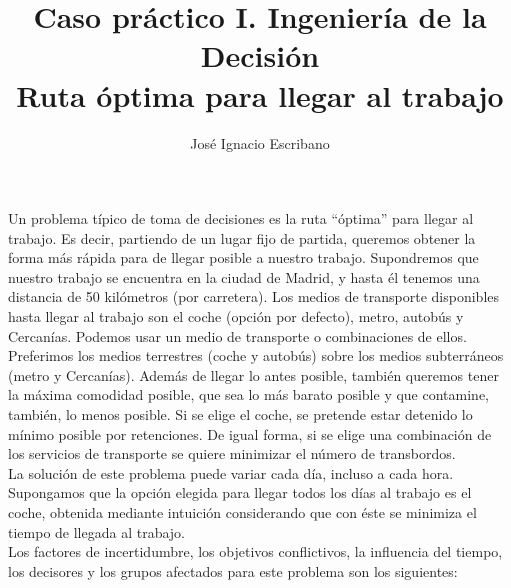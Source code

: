 \documentclass[12pt,a4paper,openright,final]{article}
\author{José Ignacio Escribano}
\title{Caso práctico I. Ingeniería de la Decisión \\ \textbf{Ruta óptima para llegar al trabajo}}
\begin{document}
\maketitle

Un problema típico de toma de decisiones es la ruta ``óptima'' para llegar al trabajo. Es decir, partiendo de un lugar fijo de partida, queremos obtener la forma más rápida para de llegar posible a nuestro trabajo. Supondremos que nuestro trabajo se encuentra en la ciudad de Madrid, y hasta él tenemos una distancia de 50 kilómetros (por carretera). Los medios de transporte disponibles hasta llegar al trabajo son el coche (opción por defecto), metro, autobús y Cercanías. Podemos usar un medio de transporte o combinaciones de ellos. Preferimos los medios terrestres (coche y autobús) sobre los medios subterráneos (metro y Cercanías). Además de llegar lo antes posible, también queremos tener la máxima comodidad posible, que sea lo más barato posible y que contamine, también, lo menos posible. Si se elige el coche, se pretende estar detenido lo mínimo posible por retenciones. De igual forma, si se elige una combinación de los servicios de transporte se quiere minimizar el número de transbordos.\\

La solución de este problema puede variar cada día, incluso a cada hora. Supongamos que la opción elegida para llegar todos los días al trabajo es el coche, obtenida mediante intuición considerando que con éste se minimiza el tiempo de llegada al trabajo.\\

Los factores de incertidumbre, los objetivos conflictivos, la influencia del tiempo, los decisores y los grupos afectados para este problema son los siguientes:
\end{document}
